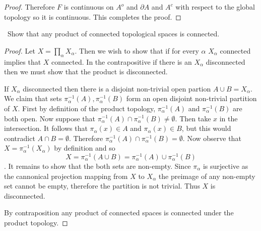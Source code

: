 \documentclass[11pt]{amsart}
\theoremstyle{definition}
\numberwithin{theorem}{section}
\numberwithin{definition}{section}
\numberwithin{equation}{section}
\begin{document}
\begin{proof}
	 Therefore $F$ is continuous on $A^o$ and $\partial A$ and $A^c$ with respect to the global topology so it is continuous. This completes the proof.
	\end{proof}
\medskip {}\ Show that any product of connected topological spaces is connected.
\begin{proof}
	Let $X = \prod_{\alpha} X_\alpha.$ Then we wish to show that if for every $\alpha$ $X_\alpha$ connected implies that $X$ connected. In the contrapositive if there is an $X_\alpha$ disconnected then we must show that the product is disconnected.

	If $X_\alpha$ disconnected then there is a disjoint non-trivial open partion $A \cup B = X_\alpha$. We claim that sets $\pi^{-1}_\alpha(A), \pi^{-1}_\alpha(B)$ form an open disjoint non-trivial partition of $X$. First by definition
	of the product topology, $\pi^{-1}_\alpha(A)$ and $\pi^{-1}_\alpha(B)$ are both open. Now suppose that $\pi^{-1}_\alpha(A) \cap \pi^{-1}_\alpha(B) \neq \emptyset.$ Then take $x$ in the intersection. It follows that $\pi_\alpha(x) \in A$ and $\pi_\alpha(x) \in B$, but this would contradict $A \cap B = \emptyset.$ Therefore $\pi^{-1}_\alpha(A) \cap \pi^{-1}_\alpha(B) = \emptyset.$ Now observe that $X = \pi^{-1}_\alpha(X_\alpha)$ by definition and so $$X = \pi^{-1}_\alpha(A \cup B) = \pi^{-1}_\alpha(A) \cup \pi^{-1}_\alpha(B) $$. It remains to show that the both sets are non-empty. Since $\pi_\alpha$ is surjective as the cannonical projection mapping from $X$ to $X_\alpha$ the preimage of any non-empty set cannot be empty, therefore the partition is not trivial. Thus $X$ is disconnected.

	By contraposition any product of connected spaces is connected under the product topology.
\end{proof}
\end{document}
